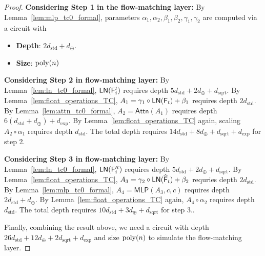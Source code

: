 \begin{proof}
    {\bf Considering Step 1 in the flow-matching layer:}
    By Lemma~\ref{lem:mlp_tc0_formal}, parameters $\alpha_1,\alpha_2,\beta_1,\beta_2,\gamma_1,\gamma_2$ are computed via a circuit with 
    \begin{itemize}
        \item {\bf Depth}: $2d_{\mathrm{std}} + d_\oplus$.
        \item {\bf Size}: $\operatorname{poly}(n)$
    \end{itemize}


    
    {\bf Considering Step 2 in flow-matching layer:} 
     By Lemma~\ref{lem:ln_tc0_formal}, $\mathsf{LN}(\mathsf{F}_i^t)$ requires depth $5d_\mathrm{std} + 2d_{\oplus} + d_\mathrm{sqrt}$. By Lemma~\ref{lem:float_operations_TC}, $A_1 = \gamma_1 \circ \mathsf{LN}(\mathsf{F}_t)+\beta_1$ requires depth $2d_{\mathrm{std}}$. By Lemma~\ref{lem:attn_tc0_formal}, $A_2 = \mathsf{Attn}(A_1)$ requires depth $6(d_{\mathrm{std}}+d_\oplus)+d_{\exp}$. By Lemma~\ref{lem:float_operations_TC} again, scaling $A_2 \circ \alpha_1$ requires depth $d_{\mathrm{std}}$. The total depth requires $14d_{\mathrm{std}} + 8d_{\oplus}+d_{\mathrm{sqrt}}+d_{\exp}$ for step 2.
    

    {\bf Considering Step 3 in flow-matching layer:} By Lemma~\ref{lem:ln_tc0_formal}, $\mathsf{LN}(\mathsf{F}'^t_i)$ requires depth $5d_\mathrm{std} + 2d_{\oplus} + d_\mathrm{sqrt}$. By Lemma~\ref{lem:float_operations_TC}, $A_3 = \gamma_2 \circ \mathsf{LN}(\widehat{\mathsf{F}}_t)+\beta_2$ requries depth  $2d_{\mathrm{std}}$. By Lemma~\ref{lem:mlp_tc0_formal}, $A_4 = \mathsf{MLP}(A_3,c,c)$ requires depth $2d_{\mathrm{std}} + d_\oplus$.
    By Lemma~\ref{lem:float_operations_TC} again, $A_4 \circ \alpha_2$ requires depth $d_{\mathrm{std}}$. The total depth requires $10d_{\mathrm{std}}+3d_{\oplus}+d_{\mathrm{sqrt}}$  for step 3..

    Finally, combining the result above, we need a circuit with depth $26d_{\mathrm{std}}+ 12 d_{\oplus} + 2d_{\mathrm{sqrt}} + d_{\exp}$ and size $\operatorname{poly}(n)$ to simulate the flow-matching layer.
    
\end{proof}



